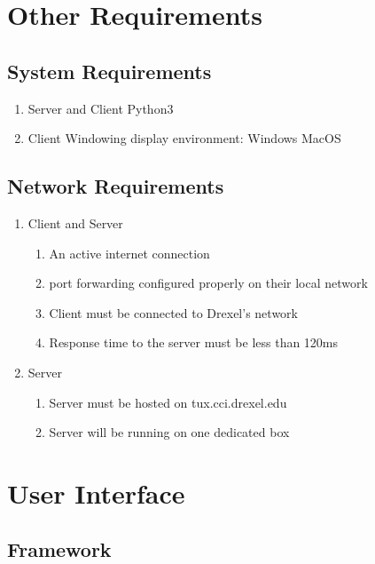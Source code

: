 \documentclass[10pt]{article}
\begin{document}
\section{Other Requirements}

\subsection{System Requirements}

\begin{enumerate}[label*=S\arabic*.]
    \item Server and Client
        \subitem Python3
    \item Client
        \subitem Windowing display environment:
            \subsubitem Windows
            \subsubitem MacOS
\end{enumerate}

\subsection{Network Requirements}

\begin{enumerate}[label*=N\arabic*.]
    \item Client and Server
	 \begin{enumerate}[label*=\arabic*.]
        \item An active internet connection
        \item port forwarding configured properly on their local network
        \item Client must be connected to Drexel's network
        \item Response time to the server must be less than 120ms
	  \end{enumerate}
    \item Server
 	\begin{enumerate}[label*=\arabic*.]
        \item Server must be hosted on tux.cci.drexel.edu
        \item Server will be running on one dedicated box
  \end{enumerate}
\end{enumerate}

\section{User Interface}

\subsection{Framework}
\end{document}
